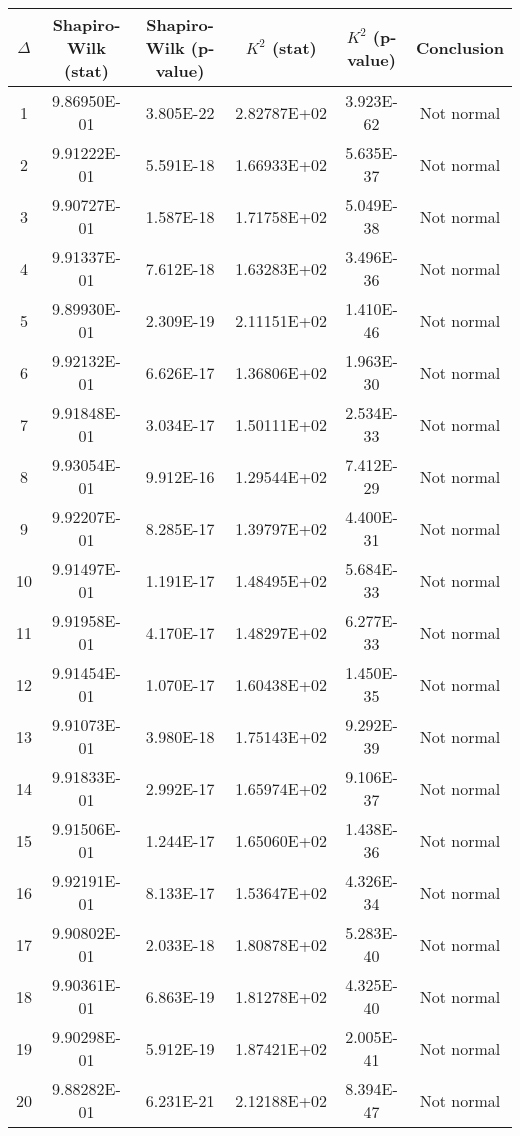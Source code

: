 \begin{table}[h]
	\begin{tabular}{|c|c|c|c|c|c|}
		\hline
		$\Delta$ &  Shapiro-Wilk (stat) & Shapiro-Wilk (p-value) & $K^2$ (stat) & $K^2$ (p-value) & Conclusion\\\hline
		\hline
		1 & 9.86950E-01 & 3.805E-22 & 2.82787E+02 & 3.923E-62 & Not normal\\\hline
		2 & 9.91222E-01 & 5.591E-18 & 1.66933E+02 & 5.635E-37 & Not normal\\\hline
		3 & 9.90727E-01 & 1.587E-18 & 1.71758E+02 & 5.049E-38 & Not normal\\\hline
		4 & 9.91337E-01 & 7.612E-18 & 1.63283E+02 & 3.496E-36 & Not normal\\\hline
		5 & 9.89930E-01 & 2.309E-19 & 2.11151E+02 & 1.410E-46 & Not normal\\\hline
		6 & 9.92132E-01 & 6.626E-17 & 1.36806E+02 & 1.963E-30 & Not normal\\\hline
		7 & 9.91848E-01 & 3.034E-17 & 1.50111E+02 & 2.534E-33 & Not normal\\\hline
		8 & 9.93054E-01 & 9.912E-16 & 1.29544E+02 & 7.412E-29 & Not normal\\\hline
		9 & 9.92207E-01 & 8.285E-17 & 1.39797E+02 & 4.400E-31 & Not normal\\\hline
		10 & 9.91497E-01 & 1.191E-17 & 1.48495E+02 & 5.684E-33 & Not normal\\\hline
		11 & 9.91958E-01 & 4.170E-17 & 1.48297E+02 & 6.277E-33 & Not normal\\\hline
		12 & 9.91454E-01 & 1.070E-17 & 1.60438E+02 & 1.450E-35 & Not normal\\\hline
		13 & 9.91073E-01 & 3.980E-18 & 1.75143E+02 & 9.292E-39 & Not normal\\\hline
		14 & 9.91833E-01 & 2.992E-17 & 1.65974E+02 & 9.106E-37 & Not normal\\\hline
		15 & 9.91506E-01 & 1.244E-17 & 1.65060E+02 & 1.438E-36 & Not normal\\\hline
		16 & 9.92191E-01 & 8.133E-17 & 1.53647E+02 & 4.326E-34 & Not normal\\\hline
		17 & 9.90802E-01 & 2.033E-18 & 1.80878E+02 & 5.283E-40 & Not normal\\\hline
		18 & 9.90361E-01 & 6.863E-19 & 1.81278E+02 & 4.325E-40 & Not normal\\\hline
		19 & 9.90298E-01 & 5.912E-19 & 1.87421E+02 & 2.005E-41 & Not normal\\\hline
		20 & 9.88282E-01 & 6.231E-21 & 2.12188E+02 & 8.394E-47 & Not normal\\\hline

\end{tabular}
\end{table}

